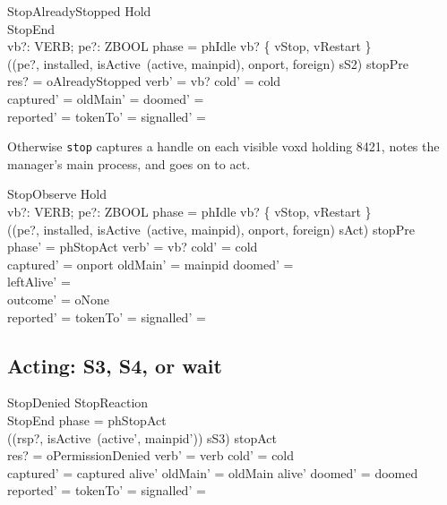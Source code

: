 \documentclass[a4paper,10pt,fleqn]{article}
\begin{document}
\begin{schema}{StopAlreadyStopped}
  Hold \\
  StopEnd \\
  vb?: VERB; pe?: ZBOOL
\where
  phase = phIdle \land vb? \in \{ vStop, vRestart \} \\
  ((pe?, installed, isActive~(active, mainpid), onport, foreign) \mapsto sS2) \in stopPre \\
  res? = oAlreadyStopped \land verb' = vb? \land cold' = cold \\
  captured' = \emptyset \land oldMain' = \emptyset \land doomed' = \emptyset \\
  reported' = \emptyset \land tokenTo' = \emptyset \land
    signalled' = \emptyset
\end{schema}

Otherwise \texttt{stop} captures a handle on each visible voxd holding 8421,
notes the manager's main process, and goes on to act.

\begin{schema}{StopObserve}
  Hold \\
  vb?: VERB; pe?: ZBOOL
\where
  phase = phIdle \land vb? \in \{ vStop, vRestart \} \\
  ((pe?, installed, isActive~(active, mainpid), onport, foreign) \mapsto sAct) \in stopPre \\
  phase' = phStopAct \land verb' = vb? \land cold' = cold \\
  captured' = onport \land oldMain' = mainpid \land doomed' = \emptyset \\
  leftAlive' = \emptyset \\
  outcome' = oNone \\
  reported' = \emptyset \land tokenTo' = \emptyset \land
    signalled' = \emptyset
\end{schema}

\subsection{Acting: S3, S4, or wait}

\begin{schema}{StopDenied}
  StopReaction \\
  StopEnd
\where
  phase = phStopAct \\
  ((rsp?, isActive~(active', mainpid')) \mapsto sS3) \in stopAct \\
  res? = oPermissionDenied \land verb' = verb \land cold' = cold \\
  captured' = captured \cap alive' \land oldMain' = oldMain \cap alive' \land
    doomed' = doomed \\
  reported' = \emptyset \land tokenTo' = \emptyset \land
    signalled' = \emptyset
\end{schema}
\end{document}
